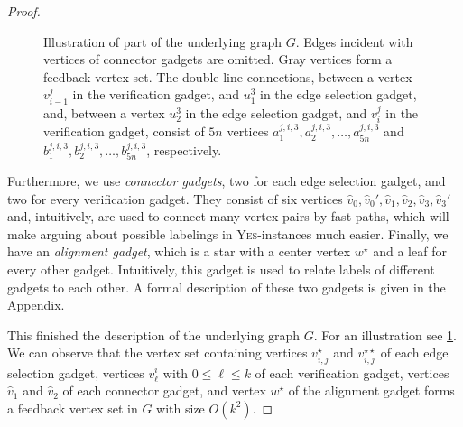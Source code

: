 \documentclass[a4paper,UKenglish,cleveref, autoref, thm-restate,anonymous]{lipics-v2021}
\begin{document}
\begin{proof}
\begin{figure}[t]
{
    }
    \caption{Illustration of part of the underlying graph $G$. Edges incident with vertices of connector gadgets are omitted. Gray vertices form a feedback vertex set.
    The double line connections, between a vertex $v_{i-1}^j$ in the verification gadget, and $u_1^3$ in the edge selection gadget, 
    and, between a vertex $u_2^3$ in the edge selection gadget, and $v_{i}^j$ in the verification gadget,
    consist of $5n$ vertices $a_1^{j,i,3},a_2^{j,i,3},\dots,a_{5n}^{j,i,3}$ 
    and $b_1^{j,i,3},b_2^{j,i,3},\dots,b_{5n}^{j,i,3}$, respectively.
    }\label{fig:hardness1}
\end{figure}


Furthermore, we use \emph{connector gadgets}, two for each edge selection gadget, and two for every verification gadget. They consist of six vertices $\hat{v}_0,\hat{v}_0',\hat{v}_1,\hat{v}_2,\hat{v}_3,\hat{v}_3'$ and, intuitively, are used to connect many vertex pairs by fast paths, which will make arguing about possible labelings in \textsc{Yes}-instances much easier. Finally, we have an \emph{alignment gadget}, which is a star with a center vertex $w^\star$ and a leaf for every other gadget. Intuitively, this gadget is used to relate labels of different gadgets to each other. A formal description of these two gadgets is given in the Appendix.

This finished the description of the underlying graph $G$. For an illustration see \cref{fig:hardness1}. We can observe that the vertex set containing
    vertices $v_{i,j}^\star$ and $v_{i,j}^{\star\star}$ of each edge selection gadget,
    vertices $v^i_\ell$ with $0\le \ell\le k$ of each verification gadget,
    vertices $\hat{v}_1$ and $\hat{v}_2$ of each connector gadget, and
    vertex $w^\star$ of the alignment gadget
forms a feedback vertex set in $G$ with size $O(k^2)$.

\begin{comment}
\emph{Duration Matrix $D$.} We proceed with describing the matrix $D$ of durations of fastest paths. For a more convenient presentation, we use the notation $d(v,v'):= D_{v,v'}$. For all vertices $v,v'$ that are neighbors in $G$ we have that $d(v,v')=1$ and $d(v',v)=1$.


\end{comment}
\end{proof}
\end{document}
